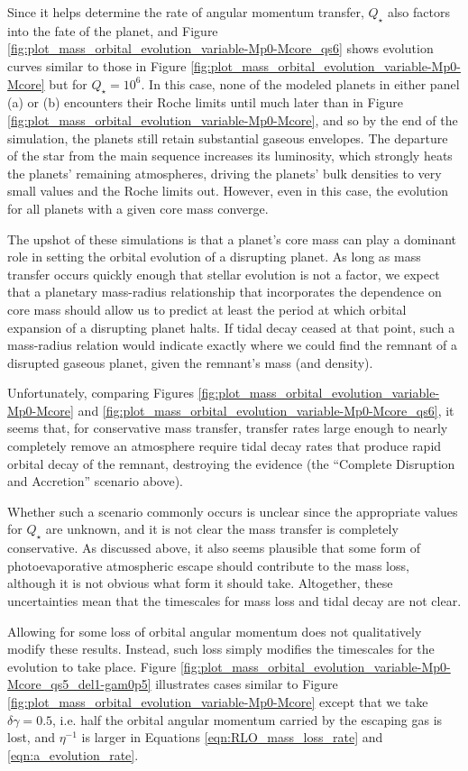 \documentclass{svjour3}                     %
\begin{document}
Since it helps determine the rate of angular momentum transfer, $Q_\star$ also factors into the fate of the planet, and Figure \ref{fig:plot_mass_orbital_evolution_variable-Mp0-Mcore_qs6} shows evolution curves similar to those in Figure \ref{fig:plot_mass_orbital_evolution_variable-Mp0-Mcore} but for $Q_\star = 10^6$. In this case, none of the modeled planets in either panel (a) or (b) encounters their Roche limits until much later than in Figure \ref{fig:plot_mass_orbital_evolution_variable-Mp0-Mcore}, and so by the end of the simulation, the planets still retain substantial gaseous envelopes. The departure of the star from the main sequence increases its luminosity, which strongly heats the planets' remaining atmospheres, driving the planets' bulk densities to very small values and the Roche limits out. However, even in this case, the evolution for all planets with a given core mass converge. 

The upshot of these simulations is that a planet's core mass can play a dominant role in setting the orbital evolution of a disrupting planet. As long as mass transfer occurs quickly enough that stellar evolution is not a factor, we expect that a planetary mass-radius relationship that incorporates the dependence on core mass should allow us to predict at least the period at which orbital expansion of a disrupting planet halts. If tidal decay ceased at that point, such a mass-radius relation would indicate exactly where we could find the remnant of a disrupted gaseous planet, given the remnant's mass (and density).

Unfortunately, comparing Figures \ref{fig:plot_mass_orbital_evolution_variable-Mp0-Mcore} and \ref{fig:plot_mass_orbital_evolution_variable-Mp0-Mcore_qs6}, it seems that, for conservative mass transfer, transfer rates large enough to nearly completely remove an atmosphere require tidal decay rates that produce rapid orbital decay of the remnant, destroying the evidence (the ``Complete Disruption and Accretion'' scenario above). 

Whether such a scenario commonly occurs is unclear since the appropriate values for $Q_\star$ are unknown, and it is not clear the mass transfer is completely conservative. As discussed above, it also seems plausible that some form of photoevaporative atmospheric escape should contribute to the mass loss, although it is not obvious what form it should take. Altogether, these uncertainties mean that the timescales for mass loss and tidal decay are not clear. 

Allowing for some loss of orbital angular momentum does not qualitatively modify these results. Instead, such loss simply modifies the timescales for the evolution to take place. Figure \ref{fig:plot_mass_orbital_evolution_variable-Mp0-Mcore_qs5_del1-gam0p5} illustrates cases similar to Figure \ref{fig:plot_mass_orbital_evolution_variable-Mp0-Mcore} except that we take $\delta \gamma = 0.5$, i.e. half the orbital angular momentum carried by the escaping gas is lost, and $\eta^{-1}$ is larger in Equations \ref{eqn:RLO_mass_loss_rate} and \ref{eqn:a_evolution_rate}.
\end{document}
